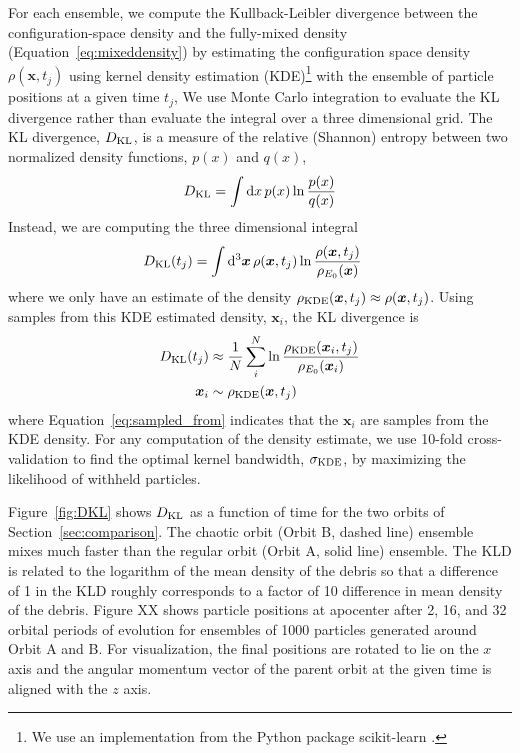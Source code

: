 \documentclass[letterpaper,12pt,preprint]{aastex}
\newcommand{\dd}{\mathrm{d}}
\newcommand{\bs}[1]{\boldsymbol{#1}}
\begin{document}
For each ensemble, we compute the Kullback-Leibler divergence \citep[KL divergence;][]{kullback51} between the configuration-space density and the fully-mixed density (Equation~\ref{eq:mixeddensity}) by estimating the configuration space density $\rho(\bs{x},t_j)$ using kernel density estimation (KDE)\footnote{We use an implementation from the Python package scikit-learn \citep{scikitlearn}.} with the ensemble of particle positions at a given time $t_j$, We use Monte Carlo integration to evaluate the KL divergence rather than evaluate the integral over a three dimensional grid. The KL divergence, $D_{\rm KL}$, is a measure of the relative (Shannon) entropy between two normalized density functions, $p(x)$ and $q(x)$,
\begin{equation}
	D_{\rm KL} = \int \dd x \, p(x) \ln \frac{p(x)}{q(x)}
\end{equation}
Instead, we are computing the three dimensional integral
\begin{align}
	D_{\rm KL}(t_j) &= \int \dd^3 \bs{x} \, \rho(\bs{x},t_j) \ln \frac{\rho(\bs{x},t_j)}{\rho_{E_0}(\bs{x})}
\end{align}
where we only have an estimate of the density $\rho_{\rm KDE}(\bs{x},t_j) \approx \rho(\bs{x},t_j)$. Using samples from this KDE estimated density, $\bs{x}_i$, the KL divergence is
\begin{align}
	D_{\rm KL}(t_j) &\approx \frac{1}{N} \sum_i^N \ln \frac{\rho_{\rm KDE}(\bs{x}_i,t_j)}{\rho_{E_0}(\bs{x}_i)}\\
	\bs{x}_i &\sim \rho_{\rm KDE}(\bs{x},t_j)\label{eq:sampled_from}
\end{align}
where Equation~\ref{eq:sampled_from} indicates that the $\bs{x}_i$ are samples from the KDE density. For any computation of the density estimate, we use 10-fold cross-validation to find the optimal kernel bandwidth, $\sigma_{\rm KDE}$, by maximizing the likelihood of withheld particles.

Figure~\ref{fig:DKL} shows $D_{\rm KL}$ as a function of time for the two orbits of Section~\ref{sec:comparison}. The chaotic orbit (Orbit B, dashed line) ensemble mixes much faster than the regular orbit (Orbit A, solid line) ensemble. The KLD is related to the logarithm of the mean density of the debris so that a difference of 1 in the KLD roughly corresponds to a factor of 10 difference in mean density of the debris. Figure XX shows particle positions at apocenter after 2, 16, and 32 orbital periods of evolution for ensembles of 1000 particles generated around Orbit A and B. For visualization, the final positions are rotated to lie on the $x$ axis and the angular momentum vector of the parent orbit at the given time is aligned with the $z$ axis.
\end{document}
